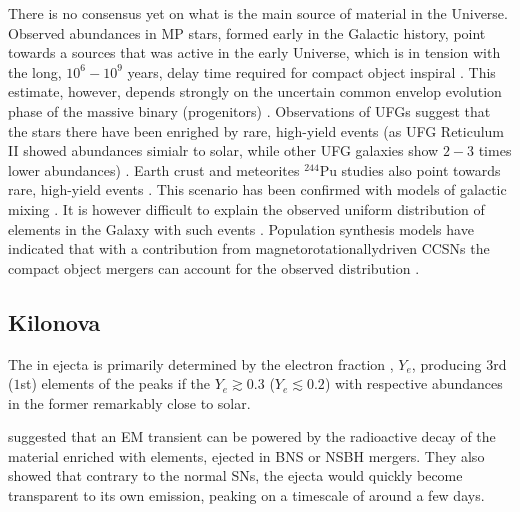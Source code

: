 There is no consensus yet on what is the main source of \rproc{} material in the 
Universe. 
Observed \rproc{} abundances in \ac{MP} stars, formed early in the Galactic history, 
point towards a sources that was active in the early Universe, which is in tension with the long, 
$10^{6} - 10^{9}$ years, delay time required for compact object inspiral 
\citep{DeDonder:2004cx,Dominik:2012kk}. This estimate, however, depends strongly on the 
uncertain common envelop evolution phase of the massive binary (progenitors)
\citep[\eg][]{Dominik:2012kk}.
%
Observations of \acp{UFG} suggest that the stars there have been enrighed by rare, 
high-yield events (as \ac{UFG} Reticulum II showed abundances simialr to solar, 
while other \ac{UFG} galaxies show $2-3$ times lower abundances) \citep{Ji:2016}.
%
Earth crust and meteorites $^{244}$Pu studies also point towards rare, high-yield 
events \citep{Wallner:2015,Tsujimoto:2017}. This scenario has been confirmed with 
models of galactic mixing \citep{Hotokezaka:2015zea}.
%
It is however difficult to explain the observed uniform distribution of \rproc{} 
elements in the Galaxy with such events \citep{Argast:2003he}.
%
Population synthesis models have indicated that with a contribution from 
magnetorotationallydriven \acp{CCSN} the compact object mergers can account for the 
observed distribution \citep{Ishimaru:2015,Cescutti:2015,Wehmeyer:2015,VanDeVoort:2015}.


\subsection{Kilonova}

The \rproc{} \nuc{} in ejecta is primarily determined by the electron fraction 
\citep{Lippuner:2015gwa}, $Y_e$, producing $3$rd ($1$st) elements of the \rproc{} peaks 
if the $Y_e\gtrsim 0.3$ ($Y_e \lesssim 0.2$) 
with respective abundances in the former remarkably close to solar. 

\citet{Li:1998bw} suggested that an \ac{EM} transient can be powered by 
the radioactive decay of the material enriched with \rproc{} elements, ejected in 
\ac{BNS} or \ac{NSBH} mergers. They also showed that contrary to the normal \acp{SN}, 
the ejecta would quickly become transparent to its own emission, peaking on a timescale 
of around a few days. 

